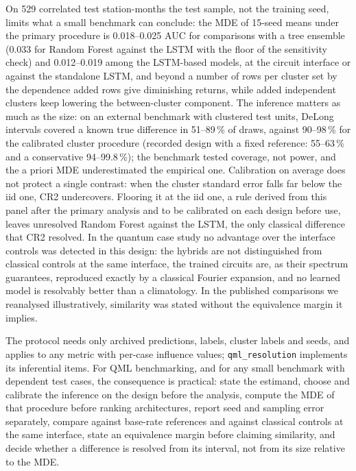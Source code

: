 \documentclass[11pt,a4paper]{article}
\begin{document}
On 529 correlated test station-months the test sample, not the training seed, limits what a small benchmark can conclude: the MDE of 15-seed means under the primary procedure is 0.018--0.025 AUC for comparisons with a tree ensemble (0.033 for Random Forest against the LSTM with the floor of the sensitivity check) and 0.012--0.019 among the LSTM-based models, at the circuit interface or against the standalone LSTM, and beyond a number of rows per cluster set by the dependence added rows give diminishing returns, while added independent clusters keep lowering the between-cluster component. The inference matters as much as the size: on an external benchmark with clustered test units, DeLong intervals covered a known true difference in 51--89\,\% of draws, against 90--98\,\% for the calibrated cluster procedure (recorded design with a fixed reference: 55--63\,\% and a conservative 94--99.8\,\%); the benchmark tested coverage, not power, and the a priori MDE underestimated the empirical one. Calibration on average does not protect a single contrast: when the cluster standard error falls far below the iid one, CR2 undercovers. Flooring it at the iid one, a rule derived from this panel after the primary analysis and to be calibrated on each design before use, leaves unresolved Random Forest against the LSTM, the only classical difference that CR2 resolved. In the quantum case study no advantage over the interface controls was detected in this design: the hybrids are not distinguished from classical controls at the same interface, the trained circuits are, as their spectrum guarantees, reproduced exactly by a classical Fourier expansion, and no learned model is resolvably better than a climatology. In the published comparisons we reanalysed illustratively, similarity was stated without the equivalence margin it implies.

The protocol needs only archived predictions, labels, cluster labels and seeds, and applies to any metric with per-case influence values; \texttt{qml\_resolution} implements its inferential items. For QML benchmarking, and for any small benchmark with dependent test cases, the consequence is practical: state the estimand, choose and calibrate the inference on the design before the analysis, compute the MDE of that procedure before ranking architectures, report seed and sampling error separately, compare against base-rate references and against classical controls at the same interface, state an equivalence margin before claiming similarity, and decide whether a difference is resolved from its interval, not from its size relative to the MDE.
\end{document}
